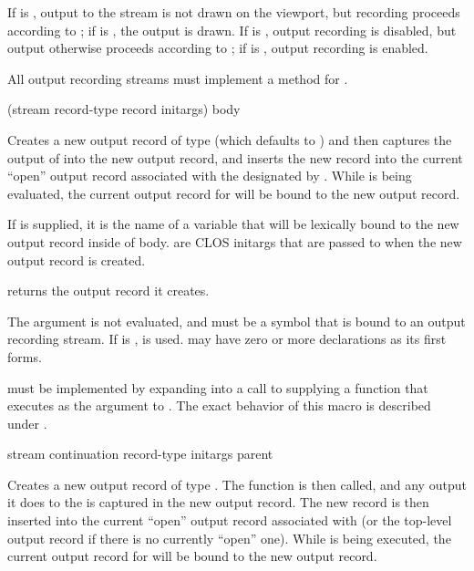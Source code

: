 If  is , output to the stream is not drawn on the
viewport, but recording proceeds according to ; if  is
, the output is drawn.  If  is , output recording
is disabled, but output otherwise proceeds according to ; if
 is , output recording is enabled.

All output recording streams must implement a method for
.


 {(stream \optional record-type record
                                     \rest initargs)
                                    \body body}

Creates a new output record of type  (which defaults to
) and then captures the output of 
into the new output record, and inserts the new record into the current ``open''
output record associated with the  designated by
.  While  is being evaluated, the current output record
for  will be bound to the new output record.

If  is supplied, it is the name of a variable that will be lexically
bound to the new output record inside of body.   are CLOS initargs
that are passed to  when the new output record is created.

 returns the output record it creates. 

The  argument is not evaluated, and must be a symbol that is bound to
an output recording stream.  If  is ,  is
used.   may have zero or more declarations as its first forms.

 must be implemented by expanding into a call to
 supplying a function that executes 
as the  argument to .  The exact
behavior of this macro is described under .

 {stream continuation record-type
                                             \rest initargs \key parent \allow}

Creates a new output record of type .  The function
 is then called, and any output it does to the   is captured in the new output record.  The new
record is then inserted into the current ``open'' output record associated with
 (or the top-level output record if there is no currently ``open''
one).  While  is being executed, the current output record for
 will be bound to the new output record.

